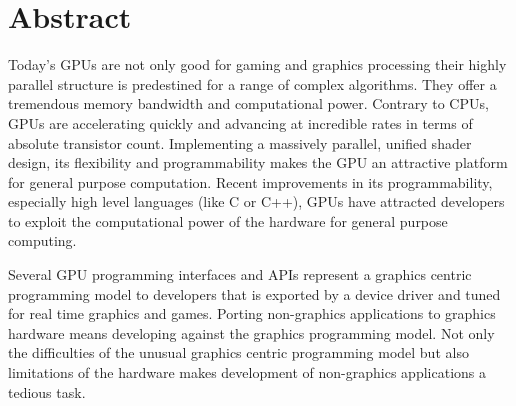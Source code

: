 \chapter*{Abstract}
\renewcommand{\chapterpagestyle}{empty}
Today's \glspl{GPU} are not only good for gaming and graphics processing their
highly parallel structure is predestined for a range of complex algorithms. They
offer a tremendous memory bandwidth and computational power. Contrary to
\glspl{CPU}, \glspl{GPU} are accelerating quickly and advancing at incredible
rates in terms of absolute transistor count. Implementing a massively parallel,
unified shader design, its flexibility and programmability makes the \gls{GPU}
an attractive platform for general purpose computation. Recent improvements in
its programmability, especially high level languages (like C or C++), %
\glspl{GPU} have attracted developers to exploit the computational power of the
hardware for general purpose computing.

Several \gls{GPU} programming interfaces and \glspl{API} represent a graphics
centric programming model to developers that is exported by a device driver and
tuned for real time graphics and games. Porting non-graphics applications to
graphics hardware means developing against the graphics programming model. Not
only the difficulties of the unusual graphics centric programming model but also
limitations of the hardware makes development of non-graphics applications a
tedious task.

